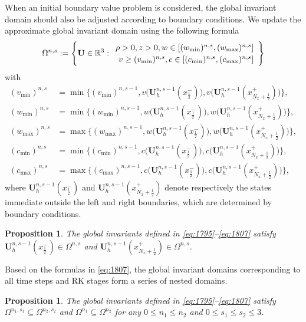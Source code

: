 \documentclass[times,final]{elsarticle}
\newtheorem{proposition}[theorem]{Proposition}
\numberwithin{equation}{section}
\theoremstyle{definition}
\theoremstyle{remark}
\newcommand{\BU}{\mathbf{U}}
\begin{document}
When an initial boundary value problem is considered, the global invariant domain should also be adjusted according to boundary conditions.
We update the approximate global invariant domain using the following formula
\begin{equation}\label{eq:1795}
	\Omega^{n,s} :=
	\left\{
	\BU \in \mathbb{R}^3
	:
	\renewcommand\arraystretch{1.2}
	\begin{array}{r}
		\rho > 0, z > 0, w \in \left[ (w_{\min})^{n,s}, (w_{\max})^{n,s} \right] \\
		v \ge (v_{\min})^{n,s},	c \in \left[ (c_{\min})^{n,s}, (c_{\max})^{n,s}  \right]
	\end{array}
	\right\}
\end{equation}
with
\begin{equation}\label{eq:1807}
	\begin{aligned}
		(v_{\min})^{n,s} & = 
		\min \big\{
		(v_{\min})^{n,s-1},v\big(\BU^{n,s-1}_h(x_{\frac12}^{-})\big),v\big(\BU^{n,s-1}_h(x_{N_x+\frac12}^{+})\big)
		\big\},
		\\
		(w_{\min})^{n,s} & = 
		\min \big\{
		(w_{\min})^{n,s-1},w\big(\BU^{n,s-1}_h(x_{\frac12}^{-})\big),w\big(\BU^{n,s-1}_h(x_{N_x+\frac12}^{+})\big)
		\big\},
		\\
		(w_{\max})^{n,s} & = 
		\max \big\{
		(w_{\max})^{n,s-1},w\big(\BU^{n,s-1}_h(x_{\frac12}^{-})\big),w\big(\BU^{n,s-1}_h(x_{N_x+\frac12}^{+})\big)
		\big\},
		\\
		(c_{\min})^{n,s} & = 
		\min \big\{
		(c_{\min})^{n,s-1},c\big(\BU^{n,s-1}_h(x_{\frac12}^{-})\big),c\big(\BU^{n,s-1}_h(x_{N_x+\frac12}^{+})\big)
		\big\},
		\\
		(c_{\max})^{n,s} & = 
		\max \big\{
		(c_{\max})^{n,s-1},c\big(\BU^{n,s-1}_h(x_{\frac12}^{-})\big),c\big(\BU^{n,s-1}_h(x_{N_x+\frac12}^{+})\big)
		\big\},
	\end{aligned}
\end{equation}
where $\BU^{n,s-1}_h(x_{\frac12}^{-})$ and $\BU^{n,s-1}_h(x_{N_x+\frac12}^{+})$ denote respectively the states immediate outside the left and right boundaries, which are determined by boundary conditions.

\begin{proposition}\label{lem:1872}
	The global invariants defined in \eqref{eq:1795}--\eqref{eq:1807} satisfy
	$\BU^{n,s-1}_h(x_{\frac12}^{-}) \in \Omega^{n,s}$ and $\BU^{n,s-1}_h(x_{N_x+\frac12}^{+}) \in \Omega^{n,s}$.
\end{proposition}

Based on the formulas in \eqref{eq:1807}, the global invariant domains corresponding to all time steps and RK stages form a series of nested domains.
\begin{proposition}\label{lem:1889}
	The global invariants defined in \eqref{eq:1795}--\eqref{eq:1807} satisfy	$\Omega^{n_1,s_1} \subseteq \Omega^{n_2,s_2}$ and $\Omega^{n_1} \subseteq \Omega^{n_2}$ for any $0 \le n_1 \le n_2$ and $0\le s_1 \le s_2\le 3$.
\end{proposition}
\end{document}
